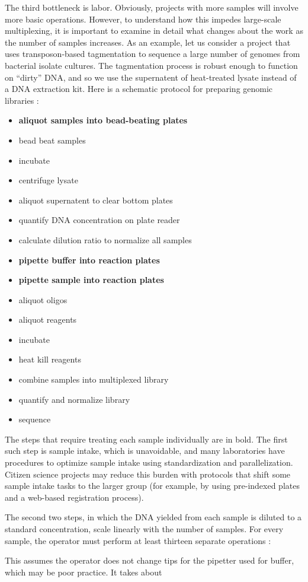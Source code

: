 \begin{refsection}
The third bottleneck is labor. Obviously, projects with more samples will involve more basic operations. However, to understand how this impedes large-scale multiplexing, it is important to examine in detail what changes about the work as the number of samples increases. As an example, let us consider a project that uses transposon-based tagmentation \cite{adey2010rapid} to sequence a large number of genomes from bacterial isolate cultures. The tagmentation process is robust enough to function on ``dirty'' DNA, and so we use the supernatent of heat-treated lysate instead of a DNA extraction kit. Here is a schematic protocol for preparing genomic libraries :

\begin{itemize}[noitemsep]
\item \textbf{aliquot samples into bead-beating plates}
\item bead beat samples
\item incubate
\item centrifuge lysate
\item aliquot supernatent to clear bottom plates
\item quantify DNA concentration on plate reader
\item calculate dilution ratio to normalize all samples
\item \textbf{pipette buffer into reaction plates}
\item \textbf{pipette sample into reaction plates}
\item aliquot oligos
\item aliquot reagents
\item incubate
\item heat kill reagents
\item combine samples into multiplexed library
\item quantify and normalize library
\item sequence
\end{itemize}

\noindent The steps that require treating each sample individually are in bold. The first such step is sample intake, which is unavoidable, and many laboratories have procedures to optimize sample intake using standardization and parallelization. Citizen science projects may reduce this burden with protocols that shift some sample intake tasks to the larger group (for example, by using pre-indexed plates and a web-based registration process). 

The second two steps, in which the DNA yielded from each sample is diluted to a standard concentration, scale linearly with the number of samples. For every sample, the operator must perform at least thirteen separate operations :



\noindent This assumes the operator does not change tips for the pipetter used for buffer, which may be poor practice. It takes about 


\printbibliography[heading=subbibliography]

\end{refsection}
